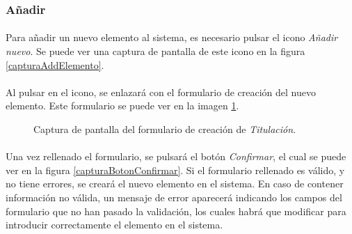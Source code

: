 \subsubsection{Añadir}

  \paragraph{}Para añadir un nuevo elemento al sistema, es necesario pulsar el
  icono \textit{Añadir nuevo}. Se puede ver una captura de pantalla de este
  icono en la figura \ref{capturaAddElemento}.

  \paragraph{}Al pulsar en el icono, se enlazará con el formulario de creación
  del nuevo elemento. Este formulario se puede ver en la imagen
  \ref{capturaAddTitulacion}.

  \begin{figure}[!ht]
    \begin{center}
      \caption{Captura de pantalla del formulario de creación de \textit{Titulación}.}
      \label{capturaAddTitulacion}
    \end{center}
  \end{figure}

  \paragraph{}Una vez rellenado el formulario, se pulsará el botón
  \textit{Confirmar}, el cual se puede ver en la figura
  \ref{capturaBotonConfirmar}. Si el formulario rellenado es válido, y no tiene
  errores, se creará el nuevo elemento en el sistema. En caso de contener
  información no válida, un mensaje de error aparecerá indicando los campos
  del formulario que no han pasado la validación, los cuales habrá que modificar
  para introducir correctamente el elemento en el sistema.
